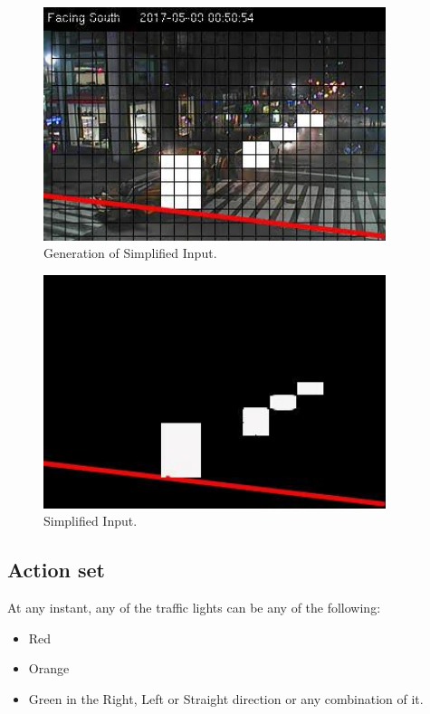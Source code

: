 \documentclass[a4paper,11pt]{report}
\begin{document}
				
				\begin{figure}[H]
					\begin{centering}
						\includegraphics[width=10cm]{images/traffic3.png}
						\caption{Generation of Simplified Input.}
					\end{centering}
				\end{figure}

				
				\begin{figure}[H]
					\begin{centering}
						\includegraphics[width=10cm]{images/traffic4.png}
						\caption{Simplified Input.}
					\end{centering}
				\end{figure}



			\subsection{Action set}
				At any instant, any of the traffic lights can be any of the following:
				\begin{itemize}
					\setlength\itemsep{0em}
					\item Red
					\item Orange
					\item Green in the Right, Left or Straight direction or any combination of it.
				\end{itemize}
\end{document}
